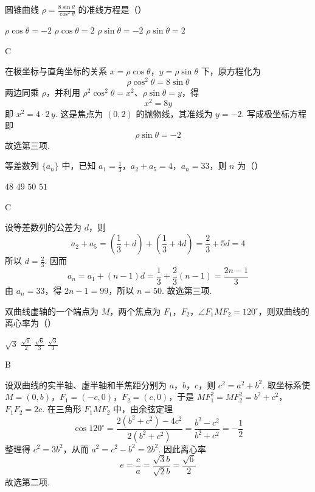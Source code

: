\begin{problem}
圆锥曲线 \(\rho = \frac{8\sin\theta}{\cos^2\theta}\) 的准线方程是（\quad）

\choices
    {\(\rho \cos \theta = -2\)}
    {\(\rho \cos \theta = 2\)}
    {\(\rho \sin \theta = -2\)}
    {\(\rho \sin \theta = 2\)}
\end{problem}

\begin{answer}
C
\end{answer}

\begin{solution}
在极坐标与直角坐标的关系 \(x=\rho\cos\theta\)，\(y=\rho\sin\theta\) 下，原方程化为
\[
\rho\cos ^2\theta=8\sin\theta
\]
两边同乘 \(\rho\)，并利用 \(\rho^2\cos ^2\theta=x^2\)、\(\rho\sin\theta=y\)，得
\[
x^2=8y
\]
即 \(x^2=4\cdot2\,y\). 这是焦点为 \((0,2)\) 的抛物线，其准线为 \(y=-2\). 写成极坐标方程即
\[
\rho\sin\theta=-2
\]
故选第三项.
\end{solution}

\begin{problem}
等差数列 \(\{a_{n}\}\) 中，已知 \(a_1 = \frac{1}{3}\)，\(a_2 + a_5 = 4\)，\(a_n = 33\)，则 \(n\) 为（\quad）

\choices
    {\(48\)}
    {\(49\)}
    {\(50\)}
    {\(51\)}
\end{problem}

\begin{answer}
C
\end{answer}

\begin{solution}
设等差数列的公差为 \(d\)，则
\[
a_2+a_5=\left(\frac13+d\right)+\left(\frac13+4d\right)=\frac23+5d=4
\]
所以 \(d=\frac23\). 因而
\[
a_n=a_1+(n-1)d=\frac13+\frac23(n-1)=\frac{2n-1}{3}
\]
由 \(a_n=33\)，得 \(2n-1=99\)，所以 \(n=50\). 故选第三项.
\end{solution}

\begin{problem}
双曲线虚轴的一个端点为 \(M\)，两个焦点为 \(F_{1}\)，\(F_{2}\)，\(\angle F_{1}MF_{2} = 120^{\circ}\)，则双曲线的离心率为（\quad）

\choices
    {\(\sqrt{3}\)}
    {\(\frac{\sqrt{6}}{2}\)}
    {\(\frac{\sqrt{6}}{3}\)}
    {\(\frac{\sqrt{3}}{3}\)}
\end{problem}

\begin{answer}
B
\end{answer}

\begin{solution}
设双曲线的实半轴、虚半轴和半焦距分别为 \(a\)，\(b\)，\(c\)，则 \(c^2=a^2+b^2\). 取坐标系使 \(M=(0,b)\)，\(F_1=(-c,0)\)，\(F_2=(c,0)\)，于是
\(MF_1^2=MF_2^2=b^2+c^2\)，\(F_1F_2=2c\).
在三角形 \(F_1MF_2\) 中，由余弦定理
\[
\cos120^{\circ}=\frac{2(b^2+c^2)-4c^2}{2(b^2+c^2)}=\frac{b^2-c^2}{b^2+c^2}=-\frac12
\]
整理得 \(c^2=3b^2\)，从而 \(a^2=c^2-b^2=2b^2\). 因此离心率
\[
e=\frac ca=\frac{\sqrt3b}{\sqrt2b}=\frac{\sqrt6}{2}
\]
故选第二项.
\end{solution}

